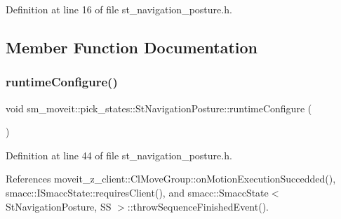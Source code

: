 Definition at line 16 of file st\+\_\+navigation\+\_\+posture.\+h.



\subsection{Member Function Documentation}
\mbox{\label{structsm__moveit_1_1pick__states_1_1StNavigationPosture_add5f3d828cb52f6320e5d60fbbf7dec6}} 
\subsubsection{\texorpdfstring{runtime\+Configure()}{runtimeConfigure()}}
{\footnotesize\ttfamily void sm\+\_\+moveit\+::pick\+\_\+states\+::\+St\+Navigation\+Posture\+::runtime\+Configure (\begin{DoxyParamCaption}{ }\end{DoxyParamCaption})\hspace{0.3cm}{\ttfamily [inline]}}



Definition at line 44 of file st\+\_\+navigation\+\_\+posture.\+h.



References moveit\+\_\+z\+\_\+client\+::\+Cl\+Move\+Group\+::on\+Motion\+Execution\+Succedded(), smacc\+::\+I\+Smacc\+State\+::requires\+Client(), and smacc\+::\+Smacc\+State$<$ St\+Navigation\+Posture, S\+S $>$\+::throw\+Sequence\+Finished\+Event().


